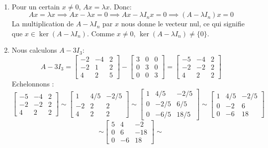 \begin{exercice} 
\,
\begin{enumerate}
    \item Pour un certain $x \neq 0$, $Ax=\lambda x$. Donc:
    $$Ax=\lambda x \implies Ax-\lambda x = 0 \implies Ax - \lambda I_nx = 0 \implies (A-\lambda I_n)x = 0$$
    La multiplication de $A-\lambda I_n$ par  $x$ nous donne le vecteur nul, ce qui signifie que $x \in \ker (A-\lambda I_n)$. Comme $x \neq 0$, $\ker (A-\lambda I_n) \neq \{0 \}$.
    \item Nous calculons $A-3I_3$:
    $$A-3I_3 = \begin{bmatrix} -2 & -4 & 2 \\ -2 & 1 & 2 \\ 4 & 2 & 5 \end{bmatrix} - \begin{bmatrix} 3 & 0 & 0 \\ 0 & 3 & 0 \\ 0 & 0 & 3 \end{bmatrix} = \begin{bmatrix} -5 & -4 & 2 \\ -2 & -2 & 2 \\ 4 & 2 & 2 \end{bmatrix}$$
    Echelonnons :
    $$\begin{bmatrix} -5 & -4 & 2 \\ 
    -2 & -2 & 2 \\ 
    4 & 2 & 2 
    \end{bmatrix} \sim 
    \begin{bmatrix} 
    1 & 4/5 & -2/5 \\ 
    -2 & 2 & 2 \\ 
    4 & 2 & 2 
    \end{bmatrix} \sim
    \begin{bmatrix} 
    1 & 4/5 & -2/5 \\ 
    0 & -2/5 & 6/5 \\ 
    0 & -6/5 & 18/5 
    \end{bmatrix} \sim
    \begin{bmatrix} 
    1 & 4/5 & -2/5 \\ 
    0 & -2 & 6 \\ 
    0 & -6 & 18 
    \end{bmatrix} $$
    $$\sim\begin{bmatrix} 
    5 & 4 & -2 \\ 
    0 & 6 & -18 \\ 
    0 & -6 & 18 
    \end{bmatrix} \sim
$$
\end{enumerate}
\end{exercice}

